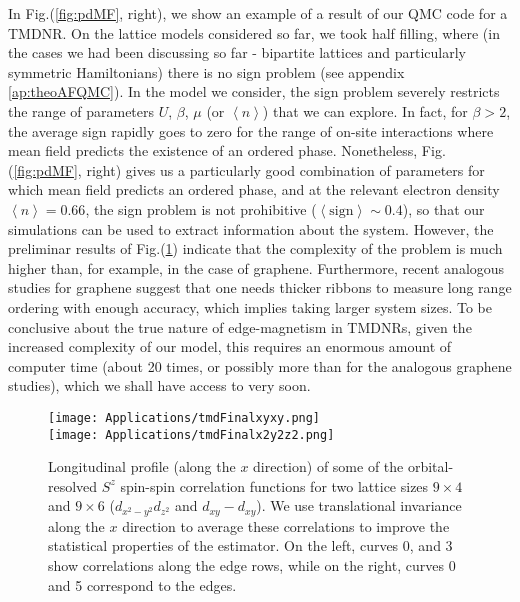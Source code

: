 In Fig.(\ref{fig:pdMF}, right), we show an example of a result of our \ac{QMC} code for a \acs{TMDNR}.
On the lattice models considered so far, we took half filling, where (in the cases we had been discussing so far - bipartite lattices and particularly symmetric Hamiltonians) there is no sign problem (see appendix \ref{ap:theoAFQMC}).
In the model we consider, the sign problem severely restricts the range of parameters $U$, $\beta$, $\mu$ (or $\left\langle n \right\rangle$) that we can explore.
In fact, for $\beta > 2$, the average sign rapidly goes to zero for the range of on-site interactions where mean field predicts the existence of an ordered phase.
Nonetheless, Fig.(\ref{fig:pdMF}, right) gives us a particularly good combination of parameters for which mean field predicts an ordered phase, and at the relevant electron density $\left\langle n \right\rangle = 0.66$, the sign problem is not prohibitive ($\left\langle \text{sign} \right\rangle \sim0.4$), so that our simulations can be used to extract information about the system.
However, the preliminar results of Fig.(\ref{fig:tmd-data}) indicate that the complexity of the problem is much higher than, for example, in the case of graphene.
Furthermore, recent analogous studies for graphene \cite{feldner_dynamical_2011, yang_strain-tuning_2017,raczkowski_interplay_2017} suggest that one needs thicker ribbons to measure long range ordering with enough accuracy, which implies taking larger system sizes.
To be conclusive about the true nature of edge-magnetism in \ac{TMDNR}s, given the increased complexity of our model, this requires an enormous amount of computer time (about 20 times, or possibly more than for the analogous graphene studies), which we shall have access to very soon.
\vspace{-0.25cm}
\begin{figure}[H]
\centering
\texttt{[image: Applications/tmdFinalxyxy.png]} \\
\hspace{-0.5cm}\texttt{[image: Applications/tmdFinalx2y2z2.png]}
	\caption[Longitudinal profile (along the $x$ direction) of orbital-resolved $S^z$ spin-spin correlation functions we measured, for two lattice sizes: $9 \times 4$ and $9 \times 6$.]{Longitudinal profile (along the $x$ direction) of some of the orbital-resolved $S^z$ spin-spin correlation functions for two lattice sizes $9 \times 4$ and $9 \times 6$ ($d_{x^2-y^2} d_{z^2}$ and $d_{xy} - d_{xy}$).
	We use translational invariance along the $x$ direction to average these correlations to improve the statistical properties of the estimator.
	On the left, curves 0, and 3 show correlations along the edge rows, while on the right, curves 0 and 5 correspond to the edges.}
	\label{fig:tmd-data}
\end{figure}

